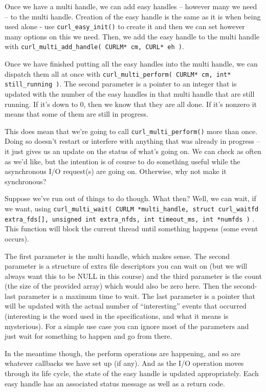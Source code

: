 Once we have a multi handle, we can add easy handles -- however many we need -- to the multi handle. Creation of the easy handle is the same as it is when being used alone - use \texttt{curl\_easy\_init()} to create it and then we can set however many options on this we need. Then, we add the easy handle to the multi handle with \texttt{curl\_multi\_add\_handle( CURLM* cm, CURL* eh )}.

Once we have finished putting all the easy handles into the multi handle, we can dispatch them all at once with \texttt{curl\_multi\_perform( CURLM* cm, int* still\_running )}. The second parameter is a pointer to an integer that is updated with the number of the easy handles in that multi handle that are still running. If it's down to 0, then we know that they are all done. If it's nonzero it means that some of them are still in progress.

This does mean that we're going to call \texttt{curl\_multi\_perform()} more than once. Doing so doesn't restart or interfere with anything that was already in progress -- it just gives us an update on the status of what's going on. We can check as often as we'd like, but the intention is of course to do something useful while the asynchronous I/O request(s) are going on. Otherwise, why not make it synchronous?

Suppose we've run out of things to do though. What then? Well, we can wait, if we want, using \texttt{curl\_multi\_wait( CURLM *multi\_handle, struct curl\_waitfd extra\_fds[], unsigned int extra\_nfds, int timeout\_ms, int *numfds )} . This function will block the current thread until something happens (some event occurs).

The first parameter is the multi handle, which makes sense. The second parameter is a structure of extra file descriptors you can wait on (but we will always want this to be NULL in this course) and the third parameter is the count (the size of the provided array) which would also be zero here. Then the second-last parameter is a maximum time to wait. The last parameter is a pointer that will be updated with the actual number of ``interesting'' events that occurred (interesting is the word used in the specifications, and what it means is mysterious). For a simple use case you can ignore most of the parameters and just wait for something to happen and go from there.

In the meantime though, the perform operations are happening, and so are whatever callbacks we have set up (if any). And as the I/O operation moves through its life cycle, the state of the easy handle is updated appropriately. Each easy handle has an associated status message as well as a return code.

